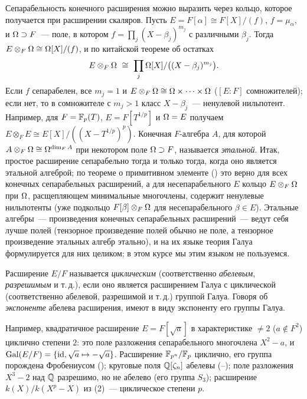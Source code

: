 \begin{aside}
Сепарабельность конечного расширения можно выразить через кольцо, которое получается при расширении скаляров. Пусть
$E=F[\alpha]\cong F[X]/(f)$, $f=\mu_\alpha$, и $\Omega\supset F$~--- поле, в котором $f=\prod_j(X-\beta_j)^{m_j}$ с различными $\beta_j$.
Тогда $E\otimes_F\Omega\cong\Omega[X]/(f)$, и по китайской теореме об остатках
\[
E\otimes_F\Om\ \cong\ \prod_j\Om[X]/\bigl((X-\beta_j)^{m_j}\bigr).
\]
Если $f$ сепарабелен, все $m_j=1$ и $E\otimes_F\Omega\cong\Omega\times\dots\times\Omega$ ($[E:F]$ сомножителей); если нет, то в
сомножителе с $m_j>1$ класс $X-\beta_j$~--- ненулевой нильпотент. Например, для $F=\mathbb F_p(T)$, $E=F[T^{1/p}]$ и $\Omega=E$ получаем
$E\otimes_FE\cong E[X]/((X-T^{1/p})^p)$. Конечная $F$-алгебра $A$, для которой $A\otimes_F\Omega\cong\Omega^{\dim_FA}$ при некотором
поле $\Omega\supset F$, называется \emph{этальной}. Итак, простое расширение сепарабельно тогда и только тогда, когда оно является
этальной алгеброй; по теореме о примитивном элементе () это верно для всех конечных сепарабельных расширений, а для
несепарабельного $E$ кольцо $E\otimes_F\Omega$ при $\Omega$, расщепляющем минимальные многочлены, содержит ненулевые
нильпотенты (уже подкольцо $F[\beta]\otimes_F\Omega$ для несепарабельного $\beta\in E$). Этальные алгебры~--- произведения конечных
сепарабельных расширений~--- ведут себя лучше полей (тензорное произведение полей обычно не поле, а тензорное
произведение этальных алгебр этально), и на их языке теория Галуа формулируется для них целиком; в этом курсе мы этим
языком не пользуемся.
\end{aside}

\begin{definition}[3.16]
Расширение $E/F$ называется \emph{циклическим} (соответственно \emph{абелевым}, \emph{разрешимым} и т.\,д.), если оно
является расширением Галуа с циклической (соответственно абелевой, разрешимой и т.\,д.) группой Галуа. Говоря об
\emph{экспоненте} абелева расширения, имеют в виду экспоненту его группы Галуа.
\end{definition}

Например, квадратичное расширение $E=F[\sqrt a]$ в характеристике $\ne2$ ($a\notin F^2$) циклично степени $2$: это поле
разложения сепарабельного многочлена $X^2-a$, и $\operatorname{Gal}(E/F)=\{\operatorname{id},\sqrt a\mapsto-\sqrt a\}$. Расширение $\mathbb F_{p^n}/\mathbb F_p$
циклично, его группа порождена Фробениусом (); круговые поля $\mathbb Q[\zeta_n]$ абелевы (--); поле
разложения $X^3-2$ над $\mathbb Q$ разрешимо, но не абелево (его группа $S_3$); расширение $k(X)/k(X^p-X)$ из (2)~---
циклическое степени $p$.
